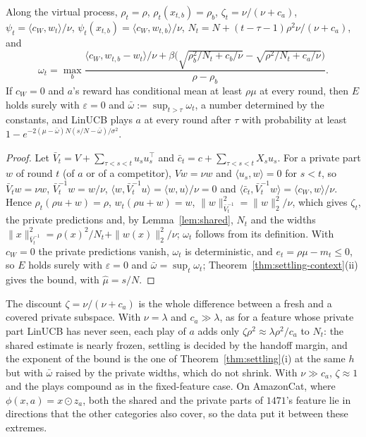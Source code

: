 \documentclass[anon]{alt2027} %
\begin{document}
\begin{proposition}
\label{prop:fresh-private}
Along the virtual process, $\rho_t=\rho$, $\rho_t(x_{t,b})=\rho_b$,
$\zeta_t=\nu/(\nu+c_a)$, $\psi_t=\langle c_W,w_t\rangle/\nu$,
$\psi_t(x_{t,b})=\langle c_W,w_{t,b}\rangle/\nu$,
$N_t=N+(t-\tau-1)\rho^2\nu/(\nu+c_a)$, and
\[
\omega_t=\max_b\frac{\langle c_W,w_{t,b}-w_t\rangle/\nu
+\beta\bigl(\sqrt{\rho_b^2/N_t+c_b/\nu}-\sqrt{\rho^2/N_t+c_a/\nu}\bigr)}{\rho-\rho_b}.
\]
If $c_W=0$ and $a$'s reward has conditional mean at least $\rho\mu$ at every
round, then $E$ holds surely with $\varepsilon=0$ and
$\bar\omega:=\sup_{t>\tau}\omega_t$, a number determined by the
constants, and LinUCB plays $a$ at every round after $\tau$ with
probability at least $1-e^{-2(\mu-\bar\omega)N(s/N-\bar\omega)/\sigma^2}$.
\end{proposition}

\begin{proof}
Let $\bar V_t=V+\sum_{\tau<s<t}u_su_s^\top$ and $\bar c_t=c+\sum_{\tau<s<t}X_su_s$.
For a private part $w$ of round $t$ (of $a$ or of a competitor),
$Vw=\nu w$ and $\langle u_s,w\rangle=0$ for $s<t$, so $\bar V_tw=\nu w$,
$\bar V_t^{-1}w=w/\nu$, $\langle w,\bar V_t^{-1}u\rangle=\langle w,u\rangle/\nu=0$
and $\langle\bar c_t,\bar V_t^{-1}w\rangle=\langle c_W,w\rangle/\nu$. Hence
$\rho_t(\rho u+w)=\rho$, $w_t(\rho u+w)=w$,
$\|w\|^2_{\bar V_t^{-1}}=\|w\|_2^2/\nu$, which gives $\zeta_t$, the private
predictions and, by Lemma~\ref{lem:shared}, $N_t$ and the widths
$\|x\|^2_{\bar V_t^{-1}}=\rho(x)^2/N_t+\|w(x)\|_2^2/\nu$; $\omega_t$ follows
from its definition. With $c_W=0$ the private predictions vanish, $\omega_t$
is deterministic, and $e_t=\rho\mu-m_t\le0$, so $E$ holds surely with
$\varepsilon=0$ and $\bar\omega=\sup_t\omega_t$; Theorem~\ref{thm:settling-context}(ii)
gives the bound, with $\widehat\mu=s/N$.
\end{proof}

The discount $\zeta=\nu/(\nu+c_a)$ is the whole difference between a fresh
and a covered private subspace. With $\nu=\lambda$ and $c_a\gg\lambda$, as
for a feature whose private part LinUCB has never seen, each play of $a$
adds only $\zeta\rho^2\approx\lambda\rho^2/c_a$ to $N_t$: the shared
estimate is nearly frozen, settling is decided by the handoff margin, and
the exponent of the bound is the one of Theorem~\ref{thm:settling}(i) at the
same $h$ but with $\bar\omega$ raised by the private widths, which do not
shrink. With $\nu\gg c_a$, $\zeta\approx1$ and the plays compound as in the
fixed-feature case. On AmazonCat, where $\phi(x,a)=x\odot z_a$, both the
shared and the private parts of $1471$'s feature lie in directions that the
other categories also cover, so the data put it between these extremes.
\end{document}

